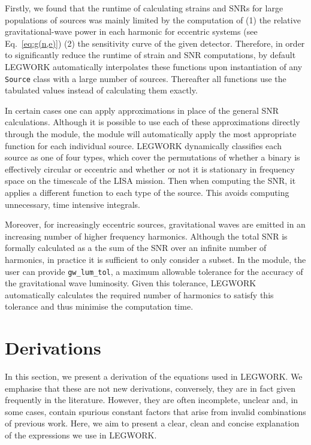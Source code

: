 \documentclass[twocolumn]{aastex631}
\newcommand{\lw}{LEGWORK}
\newcommand{\lwColour}{SeaGreen}
\newcommand{\lwModLink}[1]{\href{https://legwork.readthedocs.io/en/latest/modules.html\#module-legwork.#1}{\color{\lwColour}{\texttt{#1}}}}
\begin{document}
Firstly, we found that the runtime of calculating strains and SNRs for large populations of sources was mainly limited by the computation of (1) the relative gravitational-wave power in each harmonic for eccentric systems (see Eq.~\ref{eq:g(n,e)}) (2) the sensitivity curve of the given detector. Therefore, in order to significantly reduce the runtime of strain and SNR computations, by default \lw{} automatically interpolates these functions upon instantiation of any \texttt{Source} class with a large number of sources. Thereafter all functions use the tabulated values instead of calculating them exactly.

In certain cases one can apply approximations in place of the general SNR calculations. Although it is possible to use each of these approximations directly through the \lwModLink{snr} module, the \lwModLink{source} module will automatically apply the most appropriate function for each individual source. \lw{} dynamically classifies each source as one of four types, which cover the permutations of whether a binary is effectively circular or eccentric and whether or not it is stationary in frequency space on the timescale of the LISA mission. Then when computing the SNR, it applies a different function to each type of the source. This avoids computing unnecessary, time intensive integrals.

Moreover, for increasingly eccentric sources, gravitational waves are emitted in an increasing number of higher frequency harmonics. Although the total SNR is formally calculated as a the sum of the SNR over an infinite number of harmonics, in practice it is sufficient to only consider a subset. In the \lwModLink{source} module, the user can provide \texttt{gw\_lum\_tol}, a maximum allowable tolerance for the accuracy of the gravitational wave luminosity. Given this tolerance, \lw{} automatically calculates the required number of harmonics to satisfy this tolerance and thus minimise the computation time.

\section{Derivations}\label{sec:derivations}
In this section, we present a derivation of the equations used in \lw{}. We emphasise that these are not new derivations, conversely, they are in fact given frequently in the literature. However, they are often incomplete, unclear and, in some cases, contain spurious constant factors that arise from invalid combinations of previous work. Here, we aim to present a clear, clean and concise explanation of the expressions we use in \lw{}.
\end{document}
